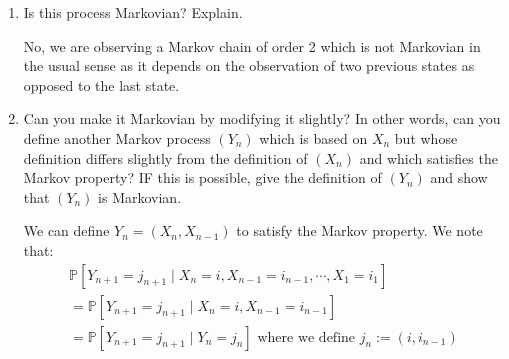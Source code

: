 \documentclass[12pt,twoside, letter]{exam}
\theoremstyle{definition}
\newcommand{\pp}{\mathbb{P}}
\begin{document}
\begin{enumerate}
  \item Is this process Markovian? Explain.
    \begin{solution}
      No, we are observing a Markov chain of order 2 which is not Markovian in the usual sense as it depends on the observation of two previous states as opposed to the last state.
    \end{solution}
  \item Can you make it Markovian by modifying it slightly? In other words, can you define another Markov process $(Y_{n})$ which is based on $X_{n}$ but whose definition differs slightly
  from the definition of $(X_{n})$ and which satisfies the Markov property? IF this is possible, give the definition of $(Y_{n})$ and show that $(Y_{n})$ is Markovian.
    \begin{solution}
      We can define $Y_{n} = (X_{n}, X_{n-1})$ to satisfy the Markov property. We note that:
        \begin{multline*}
          \pp[Y_{n+1} = j_{n+1} \mid X_n = i, X_{n-1} = i_{n-1}, \cdots, X_{1} = i_1] \\
          = \pp[Y_{n+1} = j_{n+1} \mid X_{n} = i, X_{n-1}=i_{n-1}] \\
          = \pp[Y_{n+1} = j_{n+1} \mid Y_{n} = j_{n}] \text{ where we define $j_{n} := (i, i_{n-1})$}
        \end{multline*}
    \end{solution}
\end{enumerate}
\end{document}
